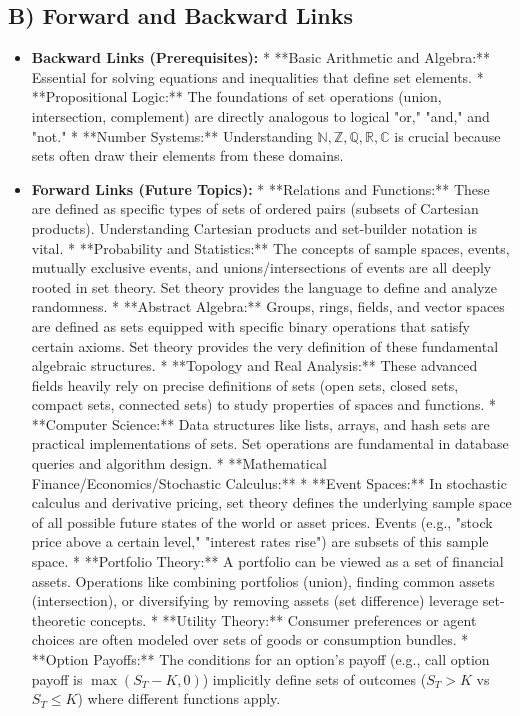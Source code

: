 \documentclass{article}
\begin{document}
\begin{itemize}
\begin{itemize}
\begin{itemize}
\begin{enumerate}
\subsection{B) Forward and Backward Links}
\begin{itemize}
    \item \textbf{Backward Links (Prerequisites):}
        *   **Basic Arithmetic and Algebra:** Essential for solving equations and inequalities that define set elements.
        *   **Propositional Logic:** The foundations of set operations (union, intersection, complement) are directly analogous to logical "or," "and," and "not."
        *   **Number Systems:** Understanding $\mathbb{N}, \mathbb{Z}, \mathbb{Q}, \mathbb{R}, \mathbb{C}$ is crucial because sets often draw their elements from these domains.
    \item \textbf{Forward Links (Future Topics):}
        *   **Relations and Functions:** These are defined as specific types of sets of ordered pairs (subsets of Cartesian products). Understanding Cartesian products and set-builder notation is vital.
        *   **Probability and Statistics:** The concepts of sample spaces, events, mutually exclusive events, and unions/intersections of events are all deeply rooted in set theory. Set theory provides the language to define and analyze randomness.
        *   **Abstract Algebra:** Groups, rings, fields, and vector spaces are defined as sets equipped with specific binary operations that satisfy certain axioms. Set theory provides the very definition of these fundamental algebraic structures.
        *   **Topology and Real Analysis:** These advanced fields heavily rely on precise definitions of sets (open sets, closed sets, compact sets, connected sets) to study properties of spaces and functions.
        *   **Computer Science:** Data structures like lists, arrays, and hash sets are practical implementations of sets. Set operations are fundamental in database queries and algorithm design.
        *   **Mathematical Finance/Economics/Stochastic Calculus:**
            *   **Event Spaces:** In stochastic calculus and derivative pricing, set theory defines the underlying sample space of all possible future states of the world or asset prices. Events (e.g., "stock price above a certain level," "interest rates rise") are subsets of this sample space.
            *   **Portfolio Theory:** A portfolio can be viewed as a set of financial assets. Operations like combining portfolios (union), finding common assets (intersection), or diversifying by removing assets (set difference) leverage set-theoretic concepts.
            *   **Utility Theory:** Consumer preferences or agent choices are often modeled over sets of goods or consumption bundles.
            *   **Option Payoffs:** The conditions for an option's payoff (e.g., call option payoff is $\max(S_T - K, 0)$) implicitly define sets of outcomes ($S_T > K$ vs $S_T \le K$) where different functions apply.


\end{itemize}
\end{enumerate}
\end{itemize}
\end{itemize}
\end{itemize}
\end{document}
